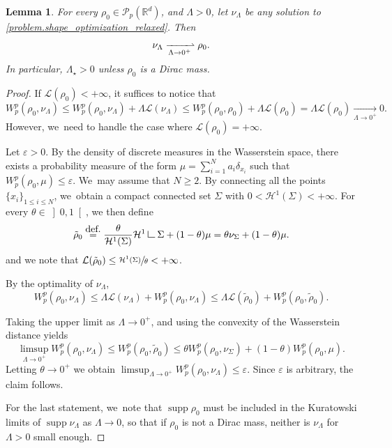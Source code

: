 \documentclass[11pt]{article}
\numberwithin{equation}{section}
\newtheorem{lemma}[theorem]{Lemma}
\theoremstyle{definition}
\newcommand{\eqdef}{\ensuremath{\stackrel{\mbox{\upshape\tiny def.}}{=}}}
\newcommand\LM[1]{\hbox{\vrule width.5pt \vbox to#1pt{\vfill \hrule width#1pt height.5pt}}}
\newcommand\LL{{\mathchoice {\>\LM7\>}{\>\LM7\>}{\,\LM5\,}{\,\LM{3.35}\,}}}
\newcommand{\mres}{\LL}
\newcommand\cH{\mathcal{H}}
\newcommand\cL{\mathcal{L}}
\newcommand{\RR}{\mathbb{R}}
\DeclareMathOperator{\supp}{supp}
\newcommand{\oi}[2]{ \left] #1, #2 \right[ }
\begin{document}
\begin{lemma}\label{lemma.cvLambdazero}
For every $\rho_0 \in \mathcal{P}_p(\RR^d)$, and $\Lambda>0$, let $\nu_\Lambda$ be any solution to \eqref{problem.shape_optimization_relaxed}. Then
\begin{equation*}
\nu_\Lambda\xrightharpoonup[\Lambda \to 0^+]{} \rho_0.
\end{equation*}
In particular, $\Lambda_\star>0$ unless $\rho_0$ is a Dirac mass.
\end{lemma}

\begin{proof}
If $\cL(\rho_0)<+\infty$, it suffices to notice that
\begin{equation*}
W_p^p(\rho_0, \nu_\Lambda)\leq W_p^p(\rho_0, \nu_\Lambda) + \Lambda \mathcal{L}(\nu_\Lambda) \leq W_p^p(\rho_0, \rho_0) + \Lambda \mathcal{L}(\rho_0) = \Lambda \mathcal{L}(\rho_0)\xrightarrow[\Lambda\to 0^+]{} 0.
\end{equation*}
However, we~need to handle the case where $\cL(\rho_0)=+\infty$.

Let $\varepsilon>0$. By the density of discrete measures in the Wasserstein space, there exists a probability measure of the form $\mu =\sum_{i=1}^{N} a_i \delta_{x_i}$ such that $W_p^p(\rho_0,\mu)\leq \varepsilon$. We~may assume that $N\geq 2$. By connecting all the points $\{x_{i}\}_{1\leq i\leq N}$, we~obtain a compact connected set $\Sigma$ with $0<\cH^1(\Sigma)<+\infty$. For every $\theta \in \oi{0}{1}$,
we then define
\begin{equation*}
\tilde{\rho}_0\eqdef \frac{\theta}{\cH^1(\Sigma)} \cH^1 \mres\Sigma + (1-\theta)\mu
= \theta \nu_\Sigma + (1-\theta)\mu.
\end{equation*}
and we note that
$\cL(\tilde{\rho}_0)\le \sfrac{\cH^1(\Sigma)}{\theta}<+\infty$.

By the optimality of $\nu_{\Lambda}$,
\begin{equation*}
W_p^p(\rho_0,\nu_{\Lambda})\le \Lambda \cL(\nu_{\Lambda})+ W_p^p(\rho_0,\nu_{\Lambda})\le \Lambda \cL(\tilde{\rho}_0)+ W_p^p(\rho_0,\tilde{\rho}_0).
\end{equation*}

Taking the upper limit as $\Lambda\to 0^+$, and using the convexity of the Wasserstein distance yields
\begin{equation*}
\limsup_{\Lambda \to 0^+} W_p^p(\rho_0,\nu_\Lambda)
\le W_p^p(\rho_0,\tilde{\rho}_0) \le
\theta W_p^p\left(\rho_0,\nu_\Sigma\right) +
(1-\theta) W_p^p(\rho_0,\mu).
\end{equation*}
Letting $\theta\to 0^+$ we obtain $\limsup_{\Lambda \to 0^+} W_p^p(\rho_0,\nu_\Lambda)\leq \varepsilon$. Since $\varepsilon$ is arbitrary, the claim follows.

For the last statement, we~note that $\supp \rho_0$ must
be included in the Kuratowski limits of $\supp \nu_\Lambda$ as $\Lambda\to 0$,
so that if $\rho_0$ is not a Dirac mass, neither is $\nu_\Lambda$ for $\Lambda>0$ small enough.
\end{proof}
\end{document}
